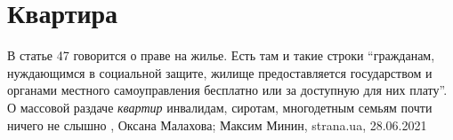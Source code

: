  
 
 
 
 
\chapter{Квартира}
\label{sec:slova.kvartira}

В статье 47 говорится о праве на жилье. Есть там и такие строки \enquote{гражданам,
нуждающимся в социальной защите, жилище предоставляется государством и органами
местного самоуправления бесплатно или за доступную для них плату}.  О массовой
раздаче \emph{квартир} инвалидам, сиротам, многодетным семьям почти ничего не слышно
, 
Оксана Малахова; Максим Минин, strana.ua, 28.06.2021

